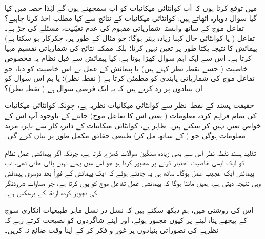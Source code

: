  میں توقع کرتا ہوں کہ  آپ کوانٹائی میکانیات کو اب  سمجھتے ہوں گے لہٰذا   حصہ  میں کیا گیا سوال دوبارہ اٹھاتے ہیں: کوانٹائی میکانیات کے نتائج سے کیا مطلب  اخذ  کرنا چاہیے؟ تفاعل موج کے ساتھ وابستہ شماریاتی مفہوم کی عدم تعیّنیت،  مسئلے کی  جڑ  ہے۔ تفاعل ( یا کوانٹائی حال کہنا زیادہ  بہتر ہوگا؛  جو مثال کے طور پر،  چکرکار ہو سکتا ہے)      پیمائش کا نتیجہ یکتا طور پر تعین نہیں کرتا؛  بلکہ ممکنہ نتائج کی شماریاتی تقسیم مہیا کرتا ہے۔  اس سے ایک اہم سوال کھڑا ہوتا ہے: کیا پیمائش سے قبل نظام یہ مخصوص خاصیت   ( جسے   نقطہ نظر کہتے ہیں)  یا پیمائش کے عمل نے اس خاصیت کو   دیا،  جو تفاعل موج کی شماریاتی پابندی کو مطمئن کرتا ہے ( نقطہ نظر)؛  یا ہم اس سوال کو ان بنیادوں پر رد کرتے ہیں کہ یہ  ایک فرضی سوال ہے  ( نقطہ نظر)؟

حقیقت پسند کے نقطہ نظر سے کوانٹائی میکانیات   نظریہ ہے،  چونکہ کوانٹائی میکانیات کی تمام فراہم کردہ معلومات ( یعنی اس کا تفاعل موج)  جانتے کے باوجود  آپ  اس کے خواص تعین نہیں کر سکتے ہیں۔ ظاہر ہے،  کوانٹائی میکانیات کے دائرہ کار  سے باہر،  مزید   معلومات  ہوگی  جو ( کے ساتھ مل کر)   طبیعی حقائق  مکمل طور پر بیان کرے گی۔

تقلید پسند نقطہ نظر اس سے بھی زیادہ سنگین سوالات کھڑے کرتا ہے،  چونکہ اگر پیمائشی عمل نظام کو ایک ایسی  خاصیت اختیار کرنے پر مجبور کرتا ہو جو اس میں پہلے نہیں پائی جاتی تھی،   تب پیمائش ایک عجیب عمل ہوگا۔ ساتھ ہی یہ جانتے ہوئے کہ ایک پیمائش کے فوراً بعد دوسری پیمائش وہی نتیجہ دیتی ہے،  ہمیں ماننا ہوگا کہ پیمائشی عمل تفاعل موج کو یوں  کرتا ہے،  جو مساوات شروڈنگر کی تجویز کردہ ارتقا کے برعکس ہے۔ 

اس کی روشنی میں،  ہم دیکھ سکتے ہیں کہ نسل در نسل ماہر طبیعیات انکاری سوچ کے پیچھے پناہ  لینے پر کیوں  مجبور  ہوئے،  اور اپنے شاگردوں کو  نصیحت کرتے رہے کہ نظریے کی  تصوراتی بنیادوں پر غور و فکر کر کے اپنا وقت ضائع نہ کریں۔

